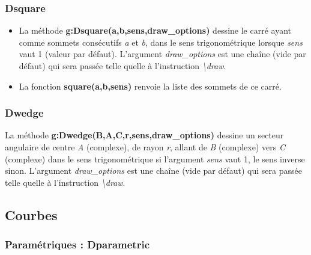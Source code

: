 \subsubsection{Dsquare}
\begin{itemize}
    \item La méthode \textbf{g:Dsquare(a,b,sens,draw\_options)} dessine le carré ayant comme sommets consécutifs \emph{a} et \emph{b}, dans le sens trigonométrique lorsque \emph{sens} vaut 1 (valeur par défaut). L'argument \emph{draw\_options} est une chaîne (vide par défaut) qui sera passée telle quelle à l'instruction \emph{\textbackslash draw}.
  \item La fonction \textbf{square(a,b,sens)} renvoie la liste des sommets de ce carré.
\end{itemize}

\subsubsection{Dwedge}
La méthode \textbf{g:Dwedge(B,A,C,r,sens,draw\_options)} dessine un secteur angulaire de centre \emph{A} (complexe), de rayon \emph{r}, allant de \emph{B} (complexe) vers \emph{C} (complexe) dans le sens trigonométrique si l'argument \emph{sens} vaut 1, le sens inverse sinon. L'argument \emph{draw\_options} est une chaîne (vide par défaut) qui sera passée telle quelle à l'instruction \emph{\textbackslash draw}.


\subsection{Courbes}

\subsubsection{Paramétriques : Dparametric}

